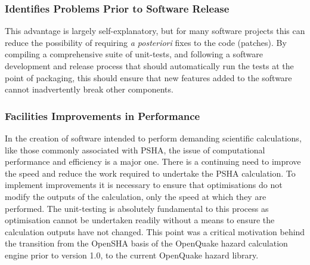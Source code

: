 \subsubsection{Identifies Problems Prior to Software Release}
This advantage is largely self-explanatory, but for many software projects 
this can reduce the possibility of requiring \emph{a posteriori} fixes to
the code (patches). By compiling a comprehensive suite of unit-tests, and 
following a software development and release process that should 
automatically run the tests at the point of packaging, this should ensure 
that new features added to the software cannot inadvertently break other 
components.
%
\subsubsection{Facilities Improvements in Performance}
In the creation of software intended to perform demanding scientific 
calculations, like those commonly associated with PSHA, the issue of 
computational performance and efficiency is a major one. 
There is a continuing need to improve the speed and reduce the work 
required to undertake the PSHA calculation. To implement improvements
it is necessary to ensure that optimisations do not modify the outputs 
of the calculation, only the speed at which they are performed. 
The unit-testing is absolutely fundamental to this process as 
optimisation cannot be undertaken readily without a means to ensure 
the calculation outputs have not changed. 
This point was a critical motivation behind the transition from the 
OpenSHA basis of the OpenQuake hazard calculation engine prior to 
version 1.0, to the current OpenQuake hazard library.
%
